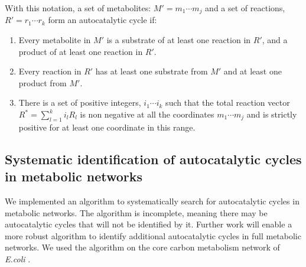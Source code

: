 With this notation, a set of metabolites: $M'={m_1\cdots m_j}$ and a set of reactions, $R'={r_1\cdots r_k}$ form an autocatalytic cycle if:
\begin{enumerate}
    \item Every metabolite in $M'$ is a substrate of at least one reaction in $R'$, and a product of at least one reaction in $R'$.
    \item Every reaction in $R'$ has at least one substrate from $M'$ and at least one product from $M'$.
    \item There is a set of positive integers, $i_1\cdots i_k$ such that the total reaction vector $R^*=\sum_{l=1}^k i_lR_l$ is non negative at all the coordinates $m_1\cdots m_j$ and is strictly positive for at least one coordinate in this range.
\end{enumerate}

  \subsection{Systematic identification of autocatalytic cycles in metabolic networks}
  We implemented an algorithm to systematically search for autocatalytic cycles in metabolic networks.
  The algorithm is incomplete, meaning there may be autocatalytic cycles that will not be identified by it.
  Further work will enable a more robust algorithm to identify additional autocatalytic cycles in full metabolic networks.
  We used the algorithm on the core carbon metabolism network of \emph{E.coli} \cite{Orth2010-vl}.


